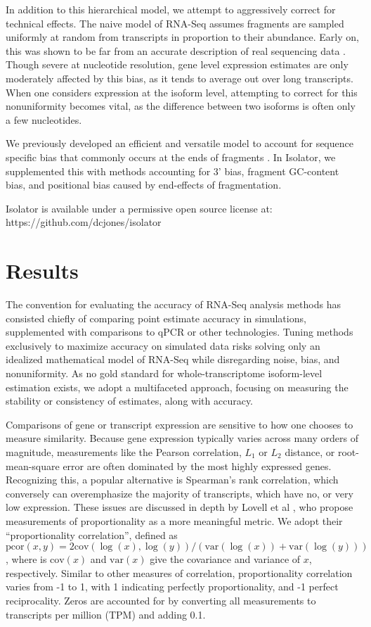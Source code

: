 \documentclass[twocolumn]{article}
\begin{document}
In addition to this hierarchical model, we attempt to aggressively correct for
technical effects. The naive model of RNA-Seq assumes fragments are sampled
uniformly at random from transcripts in proportion to their abundance. Early on,
this was shown to be far from an accurate description of real sequencing data
\cite{Hansen:2010if}. Though severe at nucleotide resolution, gene level
expression estimates are only moderately affected by this bias, as it tends to
average out over long transcripts. When one considers expression at the isoform
level, attempting to correct for this nonuniformity becomes vital, as the
difference between two isoforms is often only a few nucleotides.

We previously developed an efficient and versatile model to account for sequence
specific bias that commonly occurs at the ends of fragments \cite{Jones:2012hg}.
In Isolator, we supplemented this with methods accounting for 3' bias, fragment
GC-content bias, and positional bias caused by end-effects of fragmentation.

Isolator is available under a permissive open source license at:
https://github.com/dcjones/isolator

\section{Results}

The convention for evaluating the accuracy of RNA-Seq analysis methods has
consisted chiefly of comparing point estimate accuracy in simulations,
supplemented with comparisons to qPCR or other technologies. Tuning methods
exclusively to maximize accuracy on simulated data risks solving only an
idealized mathematical model of RNA-Seq while disregarding noise, bias, and
nonuniformity. As no gold standard for whole-transcriptome isoform-level
estimation exists, we adopt a multifaceted approach, focusing on measuring
the stability or consistency of estimates, along with accuracy.

Comparisons of gene or transcript expression are sensitive to how one chooses to
measure similarity. Because gene expression typically varies across many orders
of magnitude, measurements like the Pearson correlation, $L_1$ or $L_2$
distance, or root-mean-square error are often dominated by the most highly
expressed genes. Recognizing this, a popular alternative is Spearman's rank
correlation, which conversely can overemphasize the majority of transcripts,
which have no, or very low expression. These issues are discussed in depth by
Lovell et al \cite{Lovell:2015il}, who propose measurements of proportionality
as a more meaningful metric. We adopt their ``proportionality correlation'',
defined as $\text{pcor}(x, y) = 2\text{cov}(\log(x), \log(y)) /
(\text{var}(\log(x)) + \text{var}(\log(y)))$, where is $\text{cov}(x)$ and
$\text{var}(x)$ give the covariance and variance of $x$, respectively.  Similar
to other measures of correlation, proportionality correlation varies from -1 to
1, with 1 indicating perfectly proportionality, and -1 perfect reciprocality.
Zeros are accounted for by converting all measurements to transcripts per
million (TPM) and adding 0.1.
\end{document}

